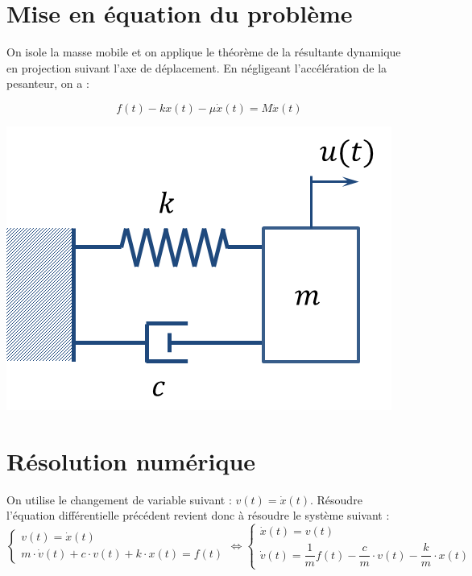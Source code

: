 \documentclass[10pt]{article}
\begin{document}
\section{Mise en équation du problème}

\begin{minipage}[c]{.77\linewidth}
On isole la masse mobile et on applique le théorème de la résultante dynamique en projection suivant l'axe de déplacement. En négligeant l'accélération de la pesanteur, on a :

\begin{equation}
f(t)-kx(t)-\mu\dot{x}(t) = M\ddot{x}(t) 
\end{equation}


\end{minipage} \hfill
\begin{minipage}[c]{.2\linewidth}
\includegraphics[width=\textwidth]{images/cellule}
\end{minipage}

\section{Résolution numérique}
On utilise le changement de variable suivant : $v(t) = \dot{x}(t)$. Résoudre l'équation différentielle précédent revient donc à résoudre le système suivant : 
\begin{equation}
\left\{ 
\begin{array}{l} 
v(t) = \dot{x}(t) \\ 
m\cdot\dot{v}(t)+c\cdot {v}(t) + k\cdot x(t) = f(t)
\end{array} \right.
\Longleftrightarrow
\left\{ 
\begin{array}{l} 
\dot{x}(t) = v(t)  \\ 
\dot{v}(t)= \dfrac{1}{m}f(t)-\dfrac{c}{m}\cdot {v}(t)- \dfrac{k}{m}\cdot x(t) 
\end{array} \right.
\end{equation}
\end{document}
